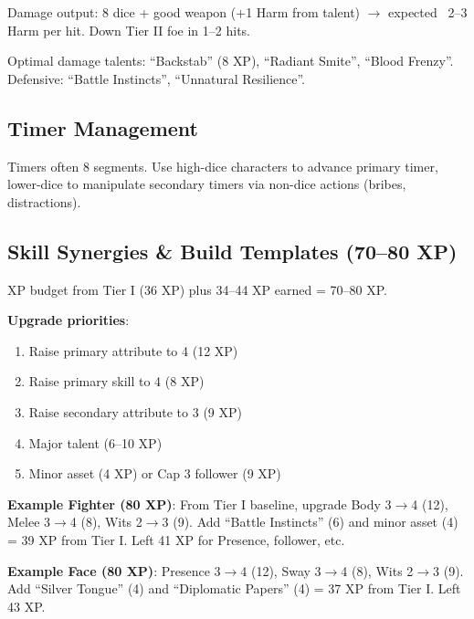 \documentclass[11pt]{article}
\begin{document}
Damage output: 8 dice + good weapon (+1 Harm from talent) $\rightarrow$ expected ~2--3 Harm per hit. Down Tier II foe in 1--2 hits.

Optimal damage talents: ``Backstab'' (8 XP), ``Radiant Smite'', ``Blood Frenzy''. Defensive: ``Battle Instincts'', ``Unnatural Resilience''.

\subsection{Timer Management}
Timers often 8 segments. Use high-dice characters to advance primary timer, lower-dice to manipulate secondary timers via non-dice actions (bribes, distractions).

\subsection{Skill Synergies \& Build Templates (70--80 XP)}
XP budget from Tier I (36 XP) plus 34--44 XP earned = 70--80 XP.

\textbf{Upgrade priorities}:
\begin{enumerate}
    \item Raise primary attribute to 4 (12 XP)
    \item Raise primary skill to 4 (8 XP)
    \item Raise secondary attribute to 3 (9 XP)
    \item Major talent (6--10 XP)
    \item Minor asset (4 XP) or Cap 3 follower (9 XP)
\end{enumerate}

\textbf{Example Fighter (80 XP)}: From Tier I baseline, upgrade Body 3$\rightarrow$4 (12), Melee 3$\rightarrow$4 (8), Wits 2$\rightarrow$3 (9). Add ``Battle Instincts'' (6) and minor asset (4) = 39 XP from Tier I. Left 41 XP for Presence, follower, etc.

\textbf{Example Face (80 XP)}: Presence 3$\rightarrow$4 (12), Sway 3$\rightarrow$4 (8), Wits 2$\rightarrow$3 (9). Add ``Silver Tongue'' (4) and ``Diplomatic Papers'' (4) = 37 XP from Tier I. Left 43 XP.
\end{document}
